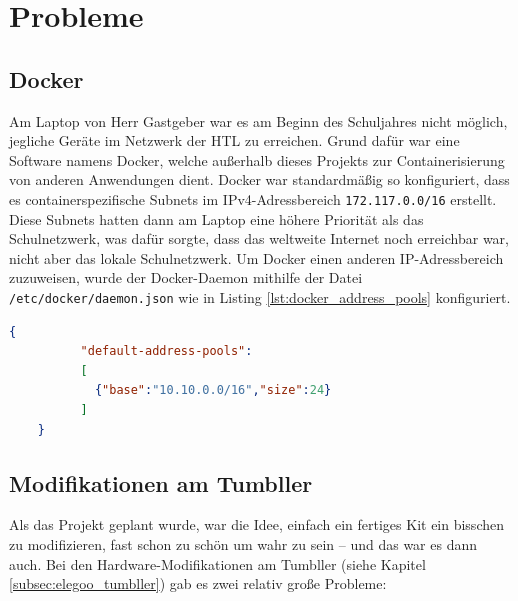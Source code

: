
\chapter{Probleme}
\label{sec:probleme}
\section{Docker}
\label{subsec:probleme_docker}
Am Laptop von Herr Gastgeber war es am Beginn des Schuljahres nicht möglich,
jegliche Geräte im Netzwerk der HTL zu erreichen.
%
Grund dafür war eine Software namens Docker,
welche außerhalb dieses Projekts zur Containerisierung von anderen Anwendungen dient.
%
Docker war standardmäßig so konfiguriert,
dass es containerspezifische Subnets im IPv4-Adressbereich \allowbreak\texttt{172.117.0.0/16} erstellt.
%
Diese Subnets hatten dann am Laptop eine höhere Priorität als das Schulnetzwerk,
was dafür sorgte,
dass das weltweite Internet noch erreichbar war, 
nicht aber das lokale Schulnetzwerk.
%
Um Docker einen anderen IP-Adressbereich zuzuweisen,
wurde der Docker-Daemon mithilfe der Datei \texttt{/etc/docker/daemon.json}
wie in Listing \ref{lst:docker_address_pools} konfiguriert.
\begin{lstlisting}[language=json,gobble=4,
    label=lst:docker_address_pools,caption=Konfiguration für den Docker-Daemon]
    {
          "default-address-pools":
          [
            {"base":"10.10.0.0/16","size":24}
          ]
    }
\end{lstlisting}

\section{Modifikationen am Tumbller}
\label{subsec:problem_tumbbler_mods}
Als das Projekt geplant wurde,
war die Idee,
einfach ein fertiges Kit ein bisschen zu modifizieren,
fast schon zu schön um wahr zu sein -- und das war es dann auch.
%
Bei den Hardware-Modifikationen am Tumbller (siehe Kapitel \ref{subsec:elegoo_tumbller}) gab es zwei relativ große Probleme:

